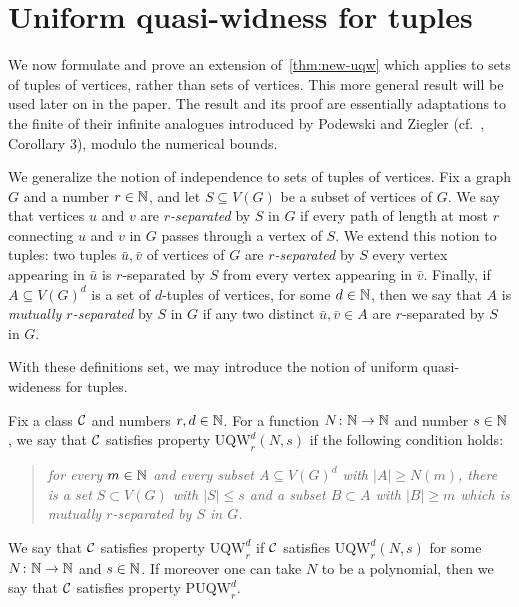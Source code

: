\section{Uniform quasi-widness for tuples}\label{sec:uqw-tuples}
We now formulate and prove an extension of~\cref{thm:new-uqw}
which applies to sets of tuples of vertices, rather than sets of vertices. 
This more general result will be used later on in the paper. 
The result and its proof are essentially adaptations to the finite of their infinite analogues introduced by Podewski and Ziegler (cf.~\cite{podewski1978stable},  Corollary 3),
modulo the numerical bounds.

We generalize the notion of independence to sets of tuples of vertices.
Fix a graph $G$ and a number $r\in \N$, and let $S\subseteq V(G)$ be a subset of vertices of $G$.
We say that vertices $u$ and $v$ are {\em{$r$-separated}} by $S$ in $G$ if every path of length at most $r$ connecting $u$ and $v$ in $G$ passes through a vertex of $S$.
We extend this notion to tuples:
two tuples $\bar u,\bar v$ of vertices of $G$ are \emph{$r$-separated} by $S$ every vertex appearing in $\bar u$ is $r$-separated by $S$ from every vertex appearing in $\bar{v}$.
Finally, if $A\subseteq V(G)^d$ is a set of $d$-tuples of vertices, for some $d\in\N$,
then we say that $A$ is \emph{mutually $r$-separated} by $S$ in $G$ 
if any two distinct $\bar u,\bar v\in A$ are $r$-separated by $S$ in $G$.

\newcommand{\uqw}{\mathrm{UQW}}
\newcommand{\puqw}{\mathrm{PUQW}}
With these definitions set, we may introduce the notion of uniform quasi-wideness for tuples.

\begin{definition}
Fix a class $\cal C$ and numbers $r,d\in\N$.
For a function $N\from\N\to\N$
and number $s\in\N$,
we say that $\cal C$ satisfies property
$\uqw^d_r(N,s)$ if the following condition holds:
   \begin{quote}\itshape 
      for every $m\in \N$ and every subset 
     $A\subseteq V(G)^d$ with $|A|\ge N(m)$, there is a set $S\subset V(G)$ with $|S|\le s$ and a subset $B\subset A$ with $|B|\ge m$ which is mutually $r$-separated by $S$ in $G$.
   \end{quote}   
    We say that $\cal C$ satisfies property $\uqw^d_r$ if  $\cal C$ satisfies $\uqw^d_r(N,s)$ for 
	some $N\from\N\to\N$ and $s\in\N$.
	If moreover one can take $N$ to be a polynomial,
	then we say that $\cal C$ satisfies property $\puqw^d_r$.
\end{definition}

